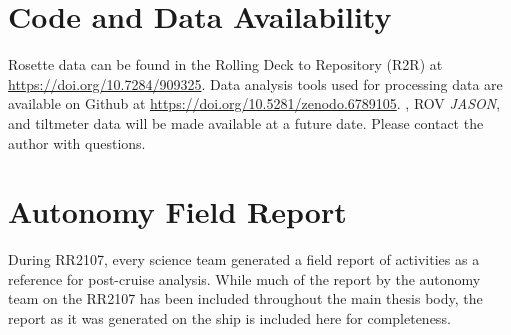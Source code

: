 \section{Code and Data Availability}
Rosette data can be found in the Rolling Deck to Repository (R2R) at \url{https://doi.org/10.7284/909325}. Data analysis tools used for processing \Sentry data are available on Github at \url{https://doi.org/10.5281/zenodo.6789105}. \Sentry, ROV \emph{JASON}, and tiltmeter data will be made available at a future date. Please contact the author with questions.

\newpage
\section{Autonomy Field Report}
During RR2107, every science team generated a field report of activities as a reference for post-cruise analysis. While much of the report by the autonomy team on the RR2107 has been included throughout the main thesis body, the report as it was generated on the ship is included here for completeness. 

